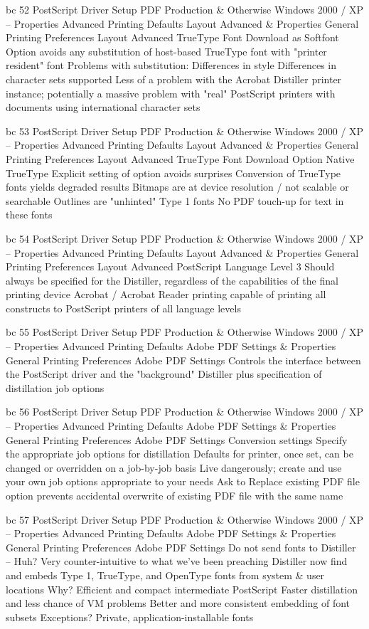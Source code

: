 \documentclass[11pt,a4paper]{article}
\begin{document}
bc 52 PostScript Driver Setup PDF Production \& Otherwise Windows 2000 / XP -- Properties Advanced Printing Defaults Layout Advanced \& Properties General Printing Preferences Layout Advanced TrueType Font Download as Softfont Option avoids any substitution of host-based TrueType font with "printer resident" font Problems with substitution: Differences in style Differences in character sets supported Less of a problem with the Acrobat Distiller printer instance; potentially a massive problem with "real" PostScript printers with documents using international character sets

bc 53 PostScript Driver Setup PDF Production \& Otherwise Windows 2000 / XP -- Properties Advanced Printing Defaults Layout Advanced \& Properties General Printing Preferences Layout Advanced TrueType Font Download Option Native TrueType Explicit setting of option avoids surprises Conversion of TrueType fonts yields degraded results Bitmaps are at device resolution / not scalable or searchable Outlines are "unhinted" Type 1 fonts No PDF touch-up for text in these fonts

bc 54 PostScript Driver Setup PDF Production \& Otherwise Windows 2000 / XP -- Properties Advanced Printing Defaults Layout Advanced \& Properties General Printing Preferences Layout Advanced PostScript Language Level 3 Should always be specified for the Distiller, regardless of the capabilities of the final printing device Acrobat / Acrobat Reader printing capable of printing all constructs to PostScript printers of all language levels

bc 55 PostScript Driver Setup PDF Production \& Otherwise Windows 2000 / XP -- Properties Advanced Printing Defaults Adobe PDF Settings \& Properties General Printing Preferences Adobe PDF Settings Controls the interface between the PostScript driver and the "background" Distiller plus specification of distillation job options

bc 56 PostScript Driver Setup PDF Production \& Otherwise Windows 2000 / XP -- Properties Advanced Printing Defaults Adobe PDF Settings \& Properties General Printing Preferences Adobe PDF Settings Conversion settings Specify the appropriate job options for distillation Defaults for printer, once set, can be changed or overridden on a job-by-job basis Live dangerously; create and use your own job options appropriate to your needs Ask to Replace existing PDF file option prevents accidental overwrite of existing PDF file with the same name

bc 57 PostScript Driver Setup PDF Production \& Otherwise Windows 2000 / XP -- Properties Advanced Printing Defaults Adobe PDF Settings \& Properties General Printing Preferences Adobe PDF Settings Do not send fonts to Distiller -- Huh? Very counter-intuitive to what we've been preaching Distiller now find and embeds Type 1, TrueType, and OpenType fonts from system \& user locations Why? Efficient and compact intermediate PostScript Faster distillation and less chance of VM problems Better and more consistent embedding of font subsets Exceptions? Private, application-installable fonts
\end{document}
